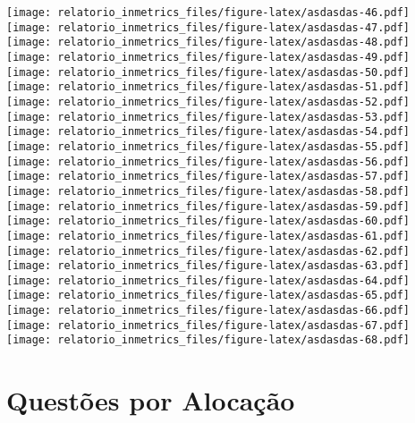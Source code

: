 \documentclass[]{book}
\begin{document}
\texttt{[image: relatorio\_inmetrics\_files/figure-latex/asdasdas-46.pdf]} \texttt{[image: relatorio\_inmetrics\_files/figure-latex/asdasdas-47.pdf]} \texttt{[image: relatorio\_inmetrics\_files/figure-latex/asdasdas-48.pdf]} \texttt{[image: relatorio\_inmetrics\_files/figure-latex/asdasdas-49.pdf]} \texttt{[image: relatorio\_inmetrics\_files/figure-latex/asdasdas-50.pdf]} \texttt{[image: relatorio\_inmetrics\_files/figure-latex/asdasdas-51.pdf]} \texttt{[image: relatorio\_inmetrics\_files/figure-latex/asdasdas-52.pdf]} \texttt{[image: relatorio\_inmetrics\_files/figure-latex/asdasdas-53.pdf]} \texttt{[image: relatorio\_inmetrics\_files/figure-latex/asdasdas-54.pdf]} \texttt{[image: relatorio\_inmetrics\_files/figure-latex/asdasdas-55.pdf]} \texttt{[image: relatorio\_inmetrics\_files/figure-latex/asdasdas-56.pdf]} \texttt{[image: relatorio\_inmetrics\_files/figure-latex/asdasdas-57.pdf]} \texttt{[image: relatorio\_inmetrics\_files/figure-latex/asdasdas-58.pdf]} \texttt{[image: relatorio\_inmetrics\_files/figure-latex/asdasdas-59.pdf]} \texttt{[image: relatorio\_inmetrics\_files/figure-latex/asdasdas-60.pdf]} \texttt{[image: relatorio\_inmetrics\_files/figure-latex/asdasdas-61.pdf]} \texttt{[image: relatorio\_inmetrics\_files/figure-latex/asdasdas-62.pdf]} \texttt{[image: relatorio\_inmetrics\_files/figure-latex/asdasdas-63.pdf]} \texttt{[image: relatorio\_inmetrics\_files/figure-latex/asdasdas-64.pdf]} \texttt{[image: relatorio\_inmetrics\_files/figure-latex/asdasdas-65.pdf]} \texttt{[image: relatorio\_inmetrics\_files/figure-latex/asdasdas-66.pdf]} \texttt{[image: relatorio\_inmetrics\_files/figure-latex/asdasdas-67.pdf]} \texttt{[image: relatorio\_inmetrics\_files/figure-latex/asdasdas-68.pdf]}

\hypertarget{questoes-por-alocacao}{%
\section{Questões por Alocação}\label{questoes-por-alocacao}}
\end{document}
